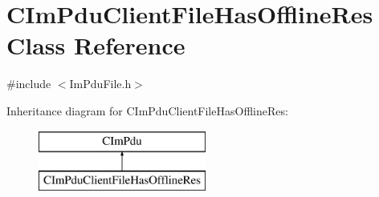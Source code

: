\hypertarget{class_c_im_pdu_client_file_has_offline_res}{}\section{C\+Im\+Pdu\+Client\+File\+Has\+Offline\+Res Class Reference}
\label{class_c_im_pdu_client_file_has_offline_res}


{\ttfamily \#include $<$Im\+Pdu\+File.\+h$>$}

Inheritance diagram for C\+Im\+Pdu\+Client\+File\+Has\+Offline\+Res\+:\begin{figure}[H]
\begin{center}
\leavevmode
\includegraphics[height=2.000000cm]{class_c_im_pdu_client_file_has_offline_res}
\end{center}
\end{figure}
